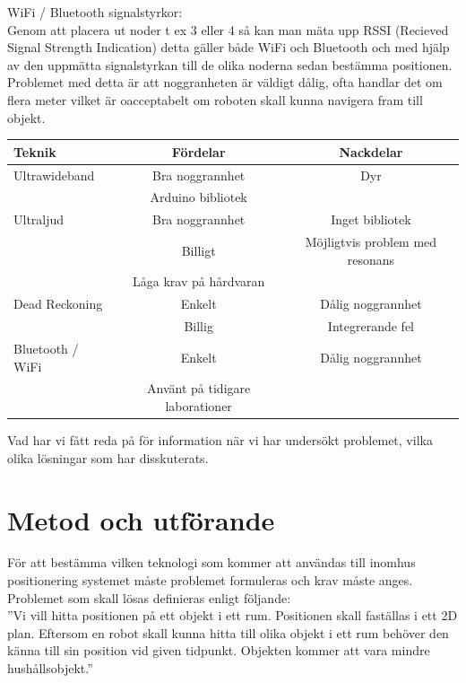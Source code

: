 \documentclass[11pt, a4paper]{report}
\begin{document}
WiFi / Bluetooth signalstyrkor: \\

Genom att placera ut noder t ex 3 eller 4 så kan man mäta upp RSSI (Recieved Signal Strength Indication) detta gäller både WiFi och Bluetooth och med hjälp av den uppmätta signalstyrkan till de olika noderna sedan bestämma positionen. Problemet med detta är att noggranheten är väldigt dålig, ofta handlar det om flera meter vilket är oacceptabelt om roboten skall kunna navigera fram till objekt.

\begin{center}
     \begin{tabular}{l | c | c}
  		Teknik & Fördelar & Nackdelar \\ \hline
        Ultrawideband & Bra noggrannhet & Dyr\\
         & Arduino bibliotek \\ \hline
        Ultraljud & Bra noggrannhet & Inget bibliotek\\
        & Billigt & Möjligtvis problem med resonans\\
        & Låga krav på hårdvaran \\ \hline
        Dead Reckoning & Enkelt & Dålig noggrannhet \\
        & Billig & Integrerande fel \\ \hline
        Bluetooth / WiFi & Enkelt & Dålig noggrannhet \\
        & Använt på tidigare laborationer
  \end{tabular}
  \end{center}


Vad har vi fått reda på för information när vi har undersökt problemet, vilka olika lösningar som har disskuterats. 

\chapter{Metod och utförande}

För att bestämma vilken teknologi som kommer att användas till inomhus positionering systemet måste problemet formuleras och krav måste anges. Problemet som skall lösas definieras enligt följande: \\

''Vi vill hitta positionen på ett objekt i ett rum. Positionen skall faställas i ett 2D plan. Eftersom en robot skall kunna hitta till olika objekt  i ett rum behöver den känna till sin position vid given tidpunkt. Objekten kommer att vara mindre hushållsobjekt.'' \\
\end{document}

